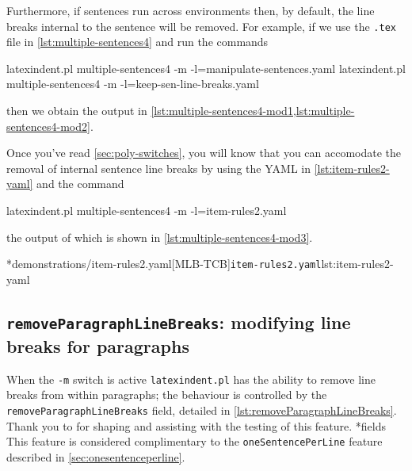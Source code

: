 	Furthermore, if sentences run across environments then, by default, the line breaks internal to the sentence will be removed.
	For example, if we use the \texttt{.tex} file in \cref{lst:multiple-sentences4} and run the commands \begin{commandshell}
latexindent.pl multiple-sentences4 -m -l=manipulate-sentences.yaml
latexindent.pl multiple-sentences4 -m -l=keep-sen-line-breaks.yaml
	\end{commandshell} then we obtain the output in \cref{lst:multiple-sentences4-mod1,lst:multiple-sentences4-mod2}.
	\begin{widepage}
	\end{widepage}
	Once you've read \cref{sec:poly-switches}, you will know that you can accomodate the removal of internal sentence line breaks by using the YAML in \cref{lst:item-rules2-yaml} and the command \begin{commandshell}
latexindent.pl multiple-sentences4 -m -l=item-rules2.yaml
	\end{commandshell} the output of which is shown in \cref{lst:multiple-sentences4-mod3}.

	\begin{minipage}{.5\linewidth}
	\end{minipage}
	\hfill
	\begin{minipage}{.5\linewidth}
		\cmhlistingsfromfile*[style=yaml-LST]*{demonstrations/item-rules2.yaml}[MLB-TCB]{\texttt{item-rules2.yaml}}{lst:item-rules2-yaml}
	\end{minipage}

\subsection{\texttt{removeParagraphLineBreaks}: modifying line breaks for paragraphs}
	When the \texttt{-m} switch is active \texttt{latexindent.pl} has the ability to remove line breaks%
	 from within paragraphs; the behaviour is controlled by the \texttt{removeParagraphLineBreaks} field, detailed in \cref{lst:removeParagraphLineBreaks}.
	Thank you to \cite{jowens} for shaping and assisting with the testing of this feature.
*{fields}
	This feature is considered complimentary to the \texttt{oneSentencePerLine} feature described in \vref{sec:onesentenceperline}.

